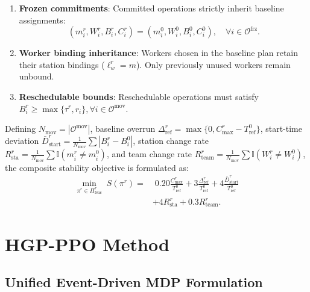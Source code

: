 \documentclass[journal,10pt]{IEEEtran}
\begin{document}
\begin{enumerate}
\item \textbf{Frozen commitments}: Committed operations strictly inherit baseline assignments:
\begin{equation}
(m_i^r, W_i^r, B_i^r, C_i^r) = (m_i^0, W_i^0, B_i^0, C_i^0), \quad \forall i\in\mathcal{O}^{\mathrm{frz}}.
\end{equation}
\item \textbf{Worker binding inheritance}: Workers chosen in the baseline plan retain their station bindings ($\ell_w^r=m$). Only previously unused workers remain unbound.
\item \textbf{Reschedulable bounds}: Reschedulable operations must satisfy $B_i^r \ge \max\{\tau^r, r_i\}, \forall i\in\mathcal{O}^{\mathrm{mov}}$.
\end{enumerate}

Defining $N_{\mathrm{mov}}=|\mathcal{O}^{\mathrm{mov}}|$, baseline overrun $\Delta_{\mathrm{ref}}^r=\max\{0, C_{\max}^r-T_{\mathrm{ref}}^0\}$, start-time deviation $\bar D_{\mathrm{start}}^r=\frac{1}{N_{\mathrm{mov}}}\sum |B_i^r-B_i^0|$, station change rate $R_{\mathrm{sta}}^r=\frac{1}{N_{\mathrm{mov}}}\sum \mathbb{I}(m_i^r\ne m_i^0)$, and team change rate $R_{\mathrm{team}}^r=\frac{1}{N_{\mathrm{mov}}}\sum \mathbb{I}(W_i^r\ne W_i^0)$, the composite stability objective is formulated as:
\begin{equation}\label{eq:reschedule_obj}
\begin{aligned}
\min_{\pi^r\in\Pi_{\mathrm{feas}}^r}\; S(\pi^r) = &\; 0.20\frac{C_{\max}^r}{T_{\mathrm{ref}}^0} + 3\frac{\Delta_{\mathrm{ref}}^r}{T_{\mathrm{ref}}^0} + 4\frac{\bar D_{\mathrm{start}}^r}{T_{\mathrm{ref}}^0} \\
&+ 4 R_{\mathrm{sta}}^r + 0.3 R_{\mathrm{team}}^r.
\end{aligned}
\end{equation}

\section{HGP-PPO Method}\label{sec:method}

\subsection{Unified Event-Driven MDP Formulation}
\end{document}
